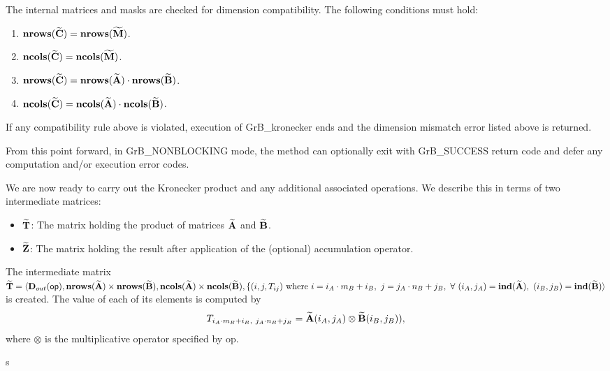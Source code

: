The internal matrices and masks are checked for dimension compatibility. The following
conditions must hold:
\begin{enumerate}
	\item $\bold{nrows}({\bf \widetilde{C}}) = \bold{nrows}({\bf \widetilde{M}})$.

	\item $\bold{ncols}({\bf \widetilde{C}}) = \bold{ncols}({\bf \widetilde{M}})$.

	\item $\bold{nrows}({\bf \widetilde{C}}) = \bold{nrows}({\bf \widetilde{A}}) \cdot \bold{nrows}({\bf \widetilde{B}})$.

	\item $\bold{ncols}({\bf \widetilde{C}}) = \bold{ncols}({\bf \widetilde{A}}) \cdot \bold{ncols}({\bf \widetilde{B}})$.
\end{enumerate}
If any compatibility rule above is violated, execution of {\sf GrB\_kronecker} ends and
the dimension mismatch error listed above is returned.

From this point forward, in {\sf GrB\_NONBLOCKING} mode, the method can 
optionally exit with {\sf GrB\_SUCCESS} return code and defer any computation 
and/or execution error codes.

We are now ready to carry out the Kronecker product and any additional 
associated operations.  We describe this in terms of two intermediate matrices:
\begin{itemize}
    \item ${\bf \widetilde{T}}$: The matrix holding the product of matrices 
    ${\bf \widetilde{A}}$ and ${\bf \widetilde{B}}$.
    \item ${\bf \widetilde{Z}}$: The matrix holding the result after 
    application of the (optional) accumulation operator.
\end{itemize}

The intermediate matrix ${\bf \widetilde{T}} = \langle
\mbox{$\mathbf{D}_{out}$}({\sf op}), 
\bold{nrows}({\bf \widetilde{A}}) \times \bold{nrows}({\bf \widetilde{B}}), 
\bold{ncols}({\bf \widetilde{A}}) \times \bold{ncols}({\bf \widetilde{B}}),
\{(i,j,T_{ij}) \text{~where~} i = i_A \cdot m_B + i_B, ~ j = j_A \cdot n_B + j_B, ~ \forall ~
(i_A, j_A) = \bold{ind}({\bf \widetilde{A}}), ~
(i_B, j_B) = \bold{ind}({\bf \widetilde{B}}) \rangle$
is created.  The value of each of its elements is computed by 
\[T_{i_A \cdot m_B + i_B,~ j_A \cdot n_B + j_B} = {\bf \widetilde{A}}(i_A,j_A) \otimes
{\bf \widetilde{B}}(i_B,j_B)),\] where $\otimes$
is the multiplicative operator specified by {\sf op}.



s
